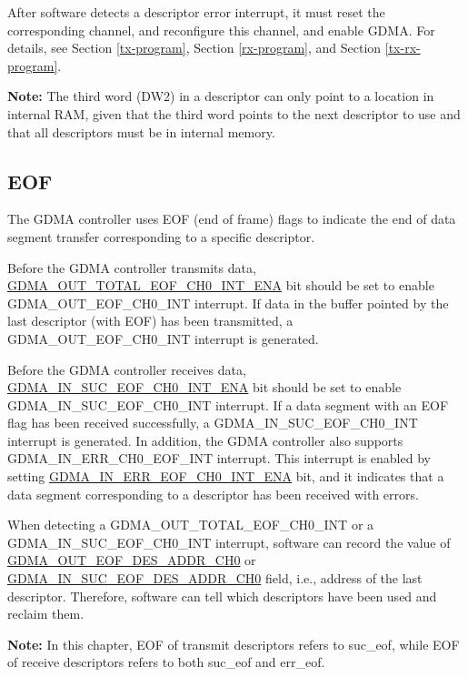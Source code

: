 \documentclass[main\_\_EN.tex]{subfiles}
\begin{document}
After software detects a descriptor error interrupt, it must reset the corresponding channel, and reconfigure this channel, and enable GDMA. For details, see Section \ref{tx-program}, Section \ref{rx-program}, and Section \ref{tx-rx-program}.

{\bfseries Note:} The third word (DW2) in a descriptor can only point to a location in internal RAM, given that the third word points to the next descriptor to use and that all descriptors must be in internal memory.

\subsection{EOF}

The GDMA controller uses EOF (end of frame) flags to indicate the end of data segment transfer corresponding to a specific descriptor.

Before the GDMA controller transmits data, \hyperref[fielddesc:GDMAOUTTOTALEOFCH0INTENA]{GDMA\_OUT\_TOTAL\_EOF\_CH0\_INT\_ENA} bit should be set to enable GDMA\_OUT\_EOF\_CH0\_INT interrupt. If data in the buffer pointed by the last descriptor (with EOF) has been transmitted, a GDMA\_OUT\_EOF\_CH0\_INT interrupt is generated.

Before the GDMA controller receives data, \hyperref[fielddesc:GDMAINSUCEOFCH0INTENA]{GDMA\_IN\_SUC\_EOF\_CH0\_INT\_ENA} bit should be set to enable GDMA\_IN\_SUC\_EOF\_CH0\_INT interrupt. If a data segment with an EOF flag has been received successfully, a GDMA\_IN\_SUC\_EOF\_CH0\_INT interrupt is generated. In addition, the GDMA controller also supports GDMA\_IN\_ERR\_CH0\_EOF\_INT interrupt. This interrupt is enabled by setting \hyperref[fielddesc:GDMAINERREOFCH0INTENA]{GDMA\_IN\_ERR\_EOF\_CH0\_INT\_ENA} bit, and it indicates that a data segment corresponding to a descriptor has been received with errors.

When detecting a GDMA\_OUT\_TOTAL\_EOF\_CH0\_INT or a GDMA\_IN\_SUC\_EOF\_CH0\_INT interrupt, software can record the value of \hyperref[fielddesc:GDMAOUTEOFDESADDRCH0]{GDMA\_OUT\_EOF\_DES\_ADDR\_CH0} or \hyperref[fielddesc:GDMAINSUCEOFDESADDRCH0]{GDMA\_IN\_SUC\_EOF\_DES\_ADDR\_CH0} field, i.e., address of the last descriptor. Therefore, software can tell which descriptors have been used and reclaim them.

{\bfseries Note: }In this chapter, EOF of transmit descriptors refers to suc\_eof, while EOF of receive descriptors refers to both suc\_eof and err\_eof.
\end{document}
